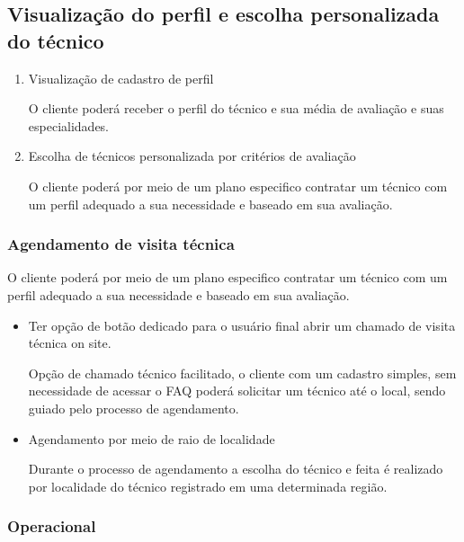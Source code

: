 \documentclass[
    12pt,               %
    openright,          %
    oneside,
    a4paper,            %
    MODELO,             %
    english,            %
    brazil              %
   ]{ifsp-spo-inf-ctds}
\begin{document}
\subsection{Visualização do perfil e escolha personalizada do técnico}

\begin{enumerate}
	
	\item Visualização de cadastro de perfil
	
	O cliente poderá receber o perfil do técnico e sua média de avaliação e suas especialidades.
	
	\item Escolha de técnicos personalizada por critérios de avaliação
	
	O cliente poderá por meio de um plano especifico contratar um técnico com um perfil adequado a sua necessidade e baseado em sua avaliação.
	
\end{enumerate}

\subsubsection{Agendamento de visita técnica}

O cliente poderá por meio de um plano especifico contratar um técnico com um perfil adequado a sua necessidade e baseado em sua avaliação.

	\begin{itemize}
	
	        \item Ter opção de botão dedicado para o usuário final abrir um chamado de visita técnica on site.
	        
	        Opção de chamado técnico facilitado, o cliente com um cadastro simples, sem necessidade de acessar o FAQ poderá solicitar um técnico até o local, sendo guiado pelo processo de agendamento.
	        
	        \item Agendamento por meio de raio de localidade
	        
	        Durante o processo de agendamento a escolha do técnico e feita é realizado por localidade do técnico registrado em uma determinada região.
	        
	\end{itemize}

\subsubsection{Operacional}
\end{document}
